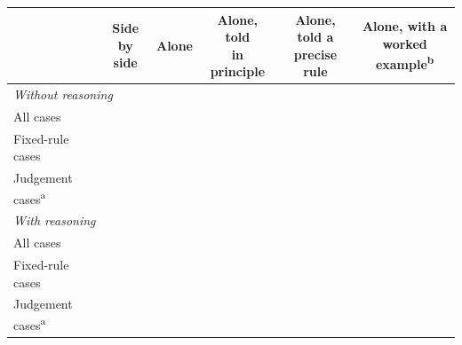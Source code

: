 \begin{table}[t]
\centering
\small
\begin{tabular}{lccccc}
\toprule
 & \shortstack{Side\\by side} & Alone & \shortstack{Alone, told\\in principle} & \shortstack{Alone, told a\\precise rule} & \shortstack{Alone, with a\\worked example\textsuperscript{b}} \\
\midrule
\multicolumn{6}{l}{\textit{Without reasoning}} \\
All cases & \bandcell{\SideBySideNoReasoning{}} & \bandcell{\AloneNoReasoning{}} & \bandcell{\ToldPrincipleNoReasoning{}} & \bandcell{\ToldRuleNoReasoning{}} & \bandcell{\ExampleSplitNoReasoning{}} \\
Fixed-rule cases & \bandcell{\SideBySideNoReasoningFixedRule{}} & \bandcell{\AloneNoReasoningFixedRule{}} & \bandcell{\ToldPrincipleNoReasoningFixedRule{}} & \bandcell{\ToldRuleNoReasoningFixedRule{}} & \bandcell{\ExampleSplitNoReasoningFixedRule{}} \\
Judgement cases\textsuperscript{a} & \bandcell{\SideBySideNoReasoningJudgement{}} & \bandcell{\AloneNoReasoningJudgement{}} & \bandcell{\ToldPrincipleNoReasoningJudgement{}} & \bandcell{\ToldRuleNoReasoningJudgement{}} & \bandcell{\ExampleSplitNoReasoningJudgement{}} \\
\multicolumn{6}{l}{\textit{With reasoning}} \\
All cases & \bandcell{\SideBySideReasoning{}} & \bandcell{\AloneReasoning{}} & \bandcell{\ToldPrincipleReasoning{}} & \bandcell{\ToldRuleReasoning{}} & \bandcell{\ExampleSplitReasoning{}} \\
Fixed-rule cases & \bandcell{\SideBySideReasoningFixedRule{}} & \bandcell{\AloneReasoningFixedRule{}} & \bandcell{\ToldPrincipleReasoningFixedRule{}} & \bandcell{\ToldRuleReasoningFixedRule{}} & \bandcell{\ExampleSplitReasoningFixedRule{}} \\
Judgement cases\textsuperscript{a} & \bandcell{\SideBySideReasoningJudgement{}} & \bandcell{\AloneReasoningJudgement{}} & \bandcell{\ToldPrincipleReasoningJudgement{}} & \bandcell{\ToldRuleReasoningJudgement{}} & \bandcell{\ExampleSplitReasoningJudgement{}} \\
\bottomrule
\end{tabular}
\par{}

\end{table}
